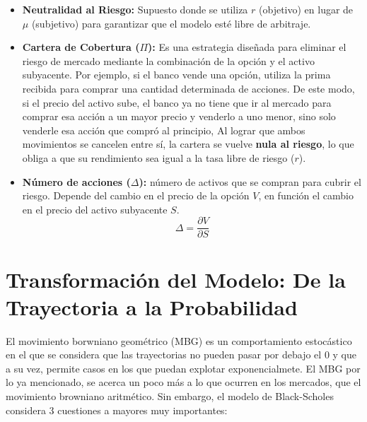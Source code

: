 \documentclass[11pt]{article}
\begin{document}
\begin{itemize}
		\item \textbf{Neutralidad al Riesgo:} Supuesto donde se utiliza $r$ (objetivo) en lugar de $\mu$ (subjetivo) para garantizar que el modelo esté libre de arbitraje.
		
		\item \textbf{Cartera de Cobertura ($\Pi$):} Es una estrategia diseñada para eliminar el riesgo de mercado mediante la combinación de la opción y el activo subyacente. Por ejemplo, si el banco vende una opción, utiliza la prima recibida para comprar una cantidad determinada de acciones. De este modo, si el precio del activo sube, el banco ya no tiene que ir al mercado para comprar esa acción a un mayor precio y venderlo a uno menor, sino solo venderle esa acción que compró al principio, Al lograr que ambos movimientos se cancelen entre sí, la cartera se vuelve \textbf{nula al riesgo}, lo que obliga a que su rendimiento sea igual a la tasa libre de riesgo ($r$).
		
		\item \textbf{Número de acciones ($\Delta$):} número de activos que se compran para cubrir el riesgo. Depende del cambio en el precio de la opción $V$, en función el cambio en el precio del activo subyacente $S$.
		\begin{equation}
			\Delta = \frac{\partial V}{\partial S}
		\end{equation}
		
		
	\end{itemize}
	\section{Transformación del Modelo: De la Trayectoria a la Probabilidad}
	
		El movimiento borwniano geométrico (MBG) es un comportamiento estocástico en el que se considera que las trayectorias no pueden pasar por debajo el 0 y que a su vez, permite casos en los que puedan explotar exponencialmete. El MBG por lo ya mencionado, se acerca un poco más a lo que ocurren en los mercados, que el movimiento browniano aritmético. Sin embargo, el modelo de Black-Scholes considera 3 cuestiones a mayores muy importantes:
			
\end{document}
